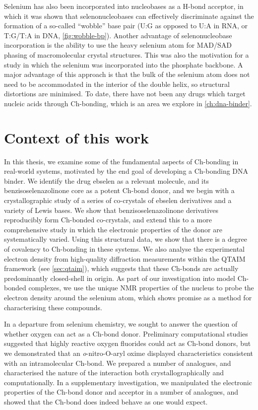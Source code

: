\begin{refsection}
Selenium has also been incorporated into nucleobases as a H-bond acceptor, in which it was shown that selenonucleobases can effectively discriminate against the formation of a so-called ``wobble'' base pair (U:G as opposed to U:A in RNA, or T:G/T:A in DNA, \cref{fig:wobble-bp}).\autocite{Hassan2010,Sun2012}
Another advantage of selenonucleobase incorporation is the ability to use the heavy selenium atom for MAD/SAD phasing of macromolecular crystal structures.\autocite{Salon2007}
This was also the motivation for a \citeyear{Conlon2019} study in which the selenium was incorporated into the phosphate backbone.\autocite{Conlon2019}
A major advantage of this approach is that the bulk of the selenium atom does not need to be accommodated in the interior of the double helix, so structural distortions are minimised.
To date, there have not been any drugs which target nucleic acids through Ch-bonding, which is an area we explore in \cref{ch:dna-binder}.

\section{Context of this work}
In this thesis, we examine some of the fundamental aspects of Ch-bonding in real-world systems, motivated by the end goal of developing a Ch-bonding DNA binder.
We identify the drug ebselen as a relevant molecule, and its benzisoselenazolinone core as a potent Ch-bond donor, and we begin with a crystallographic study of a series of co-crystals of ebselen derivatives and a variety of Lewis bases.
We show that benzisoselenazolinone derivatives reproducibly form Ch-bonded co-crystals, and extend this to a more comprehensive study in which the electronic properties of the donor are systematically varied.
Using this structural data, we show that there is a degree of covalency to Ch-bonding in these systems.
We also analyse the experimental electron density from high-quality diffraction measurements within the QTAIM framework (see \cref{sec:qtaim}), which suggests that these Ch-bonds are actually predominantly closed-shell in origin.
As part of our investigation into model Ch-bonded complexes, we use the unique NMR properties of the  nucleus to probe the electron density around the selenium atom, which shows promise as a method for characterising these compounds.

In a departure from selenium chemistry, we sought to answer the question of whether oxygen can act as a Ch-bond donor.
Preliminary computational studies suggested that highly reactive oxygen fluorides could act as Ch-bond donors\autocite{Varadwaj2019a}, but we demonstrated that an \textit{o}-nitro-O-aryl oxime displayed characteristics consistent with an intramolecular  Ch-bond.
We prepared a number of analogues, and characterised the nature of the  interaction both crystallographically and computationally.
In a supplementary investigation, we manipulated the electronic properties of the Ch-bond donor and acceptor in a number of analogues, and showed that the Ch-bond does indeed behave as one would expect.


\end{refsection}
